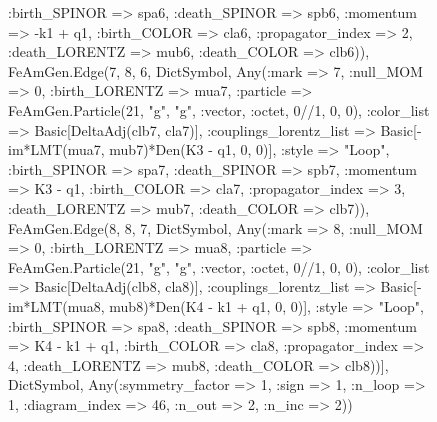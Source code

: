 \documentclass{revtex4}
\begin{document}
\begin{figure}[!htb]
\begin{center}
{:birth_SPINOR => spa6, :death_SPINOR => spb6, :momentum => -k1 + q1, :birth_COLOR => cla6, :propagator_index => 2, :death_LORENTZ => mub6, :death_COLOR => clb6)), FeAmGen.Edge(7, 8, 6, Dict{Symbol, Any}(:mark => 7, :null_MOM => 0, :birth_LORENTZ => mua7, :particle => FeAmGen.Particle(21, "g", "g", :vector, :octet, 0//1, 0, 0), :color_list => Basic[DeltaAdj(clb7, cla7)], :couplings_lorentz_list => Basic[-im*LMT(mua7, mub7)*Den(K3 - q1, 0, 0)], :style => "Loop", :birth_SPINOR => spa7, :death_SPINOR => spb7, :momentum => K3 - q1, :birth_COLOR => cla7, :propagator_index => 3, :death_LORENTZ => mub7, :death_COLOR => clb7)), FeAmGen.Edge(8, 8, 7, Dict{Symbol, Any}(:mark => 8, :null_MOM => 0, :birth_LORENTZ => mua8, :particle => FeAmGen.Particle(21, "g", "g", :vector, :octet, 0//1, 0, 0), :color_list => Basic[DeltaAdj(clb8, cla8)], :couplings_lorentz_list => Basic[-im*LMT(mua8, mub8)*Den(K4 - k1 + q1, 0, 0)], :style => "Loop", :birth_SPINOR => spa8, :death_SPINOR => spb8, :momentum => K4 - k1 + q1, :birth_COLOR => cla8, :propagator_index => 4, :death_LORENTZ => mub8, :death_COLOR => clb8))], Dict{Symbol, Any}(:symmetry_factor => 1, :sign => 1, :n_loop => 1, :diagram_index => 46, :n_out => 2, :n_inc => 2)) 
}
\end{center}
\end{figure}
\end{document}

